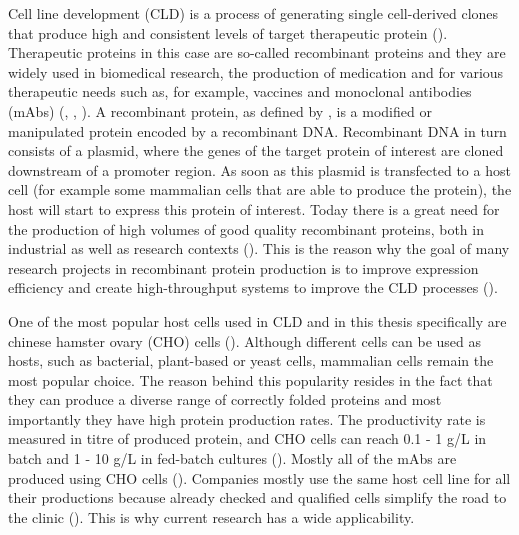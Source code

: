 Cell line development (CLD) is a process of generating single cell-derived clones that produce high and consistent levels of target therapeutic protein (\cite{lonza}). Therapeutic proteins in this case are so-called recombinant proteins and they are widely used in biomedical research, the production of medication and for various therapeutic needs such as, for example, vaccines and monoclonal antibodies (mAbs) (\cite{Ohtake_2013}, \cite{Jefferis_2017}, \cite{Funaro_1996}). A recombinant protein, as defined by \cite{Barbeau_2018}, is a modified or manipulated protein encoded by a recombinant DNA. Recombinant DNA in turn consists of a plasmid, where the genes of the target protein of interest are cloned downstream of a promoter region. As soon as this plasmid is transfected to a host cell (for example some mammalian cells that are able to produce the protein), the host will start to express this protein of interest. Today there is a great need for the production of high volumes of good quality recombinant proteins, both in industrial as well as research contexts (\cite{Tihanyi_2020}). This is the reason why the goal of many research projects in recombinant protein production is to improve expression efficiency and create high-throughput systems to improve the CLD processes (\cite{Tihanyi_2020}).



One of the most popular host cells used in CLD and in this thesis specifically are chinese hamster ovary (CHO) cells (\cite{Castan_2018}). Although different cells can be used as hosts, such as bacterial, plant-based or yeast cells, mammalian cells remain the most popular choice. The reason behind this popularity resides in the fact that they can produce a diverse range of correctly folded proteins and most importantly they have high protein production rates. The productivity rate is measured in titre of produced protein, and CHO cells can reach 0.1 - 1 g/L in batch and 1 - 10 g/L in fed-batch cultures (\cite{Tihanyi_2020}). Mostly all of the mAbs are produced using CHO cells (\cite{Lalonde_2017}). Companies mostly use the same host cell line for all their productions because already checked and qualified cells simplify the road to the clinic (\cite{Tihanyi_2020}). This is why current research has a wide applicability.

